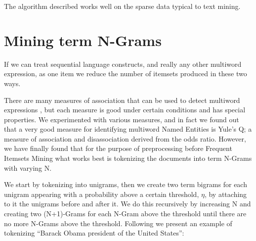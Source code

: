 \documentclass{sig-alternate}
\begin{document}
The algorithm described works well on the sparse data typical to text mining. 

\section{Mining term N-Grams}
\label{sec:ngrams}
If we can treat sequential language constructs, and really any other multiword expression, as one item we reduce the number of itemsets produced in these two ways. %

There are many measures of association that can be used to detect multiword expressions \cite{afzal}, but each measure is good under certain conditions and has special properties. We experimented with various measures, and in fact we found out that a very good measure for identifying multiword Named Entities is Yule's Q; a measure of association and disassociation derived from the odds ratio. However, we have finally found that for the purpose of preprocessing before Frequent Itemsets Mining what works best is tokenizing the documents into term N-Grams with varying N. 

We start by tokenizing into unigrams, then we
create two term bigrams for each unigram appearing with a probability above a certain threshold, $\eta$, by attaching to it the unigrams before and after it. We do this recursively by increasing N and creating two (N+1)-Grams for each N-Gram above the threshold until there are no more N-Grams above the threshold. 
Following we present an example of tokenizing ``Barack Obama president of the United States'':
\end{document}
